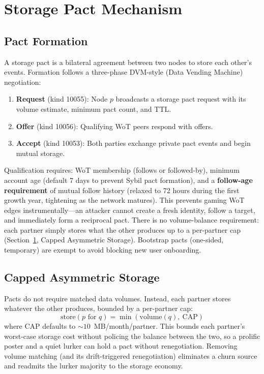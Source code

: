 \documentclass[11pt,a4paper]{article}
\begin{document}
\section{Storage Pact Mechanism}
\label{sec:pacts}

\subsection{Pact Formation}

A storage pact is a bilateral agreement between two nodes to store each other's events. Formation follows a three-phase DVM-style (Data Vending Machine) negotiation:

\begin{enumerate}
  \item \textbf{Request} (kind 10055): Node $p$ broadcasts a storage pact request with its volume estimate, minimum pact count, and TTL.
  \item \textbf{Offer} (kind 10056): Qualifying WoT peers respond with offers.
  \item \textbf{Accept} (kind 10053): Both parties exchange private pact events and begin mutual storage.
\end{enumerate}

Qualification requires: WoT membership (follows or followed-by), minimum account age (default 7 days to prevent Sybil pact formation), and a \textbf{follow-age requirement} of mutual follow history (relaxed to 72 hours during the first growth year, tightening as the network matures). This prevents gaming WoT edges instrumentally---an attacker cannot create a fresh identity, follow a target, and immediately form a reciprocal pact. There is no volume-balance requirement: each partner simply stores what the other produces up to a per-partner cap (Section~\ref{sec:pacts}, Capped Asymmetric Storage). Bootstrap pacts (one-sided, temporary) are exempt to avoid blocking new user onboarding.

\subsection{Capped Asymmetric Storage}

Pacts do not require matched data volumes. Instead, each partner stores whatever the other produces, bounded by a per-partner cap:
\begin{equation}
  \text{store}(p \text{ for } q) = \min(\text{volume}(q),\ \text{CAP})
\end{equation}
where CAP defaults to ${\sim}10$~MB/month/partner. This bounds each partner's worst-case storage cost without policing the balance between the two, so a prolific poster and a quiet lurker can hold a pact without renegotiation. Removing volume matching (and its drift-triggered renegotiation) eliminates a churn source and readmits the lurker majority to the storage economy.
\end{document}
